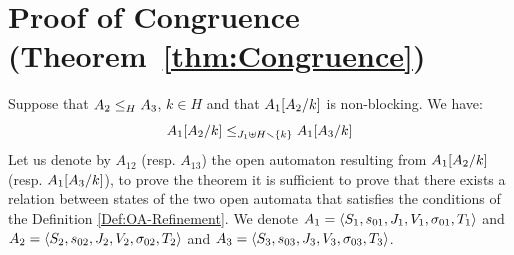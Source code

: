 \documentclass[runningheads]{llncs}
\begin{document}
\begin{enumerate}

\end{enumerate}
\section{Proof of Congruence (Theorem~\ref{thm:Congruence})}

Suppose that $\wrel{A_2}{A_3}{H}$, \(k \in H\) and that \(A_1\subst{A_2}{k}\) is non-blocking.
We have: \[\wrel{A_1\subst{A_2}{k}}{A_1\subst{A_3}{k}}{J_1 \uplus H \setminus \mbrc{k}}\]
\proof
Let us denote by $A_{12}$ (resp. $A_{13}$) the open automaton resulting from $A_1\subst{A_2}{k}$ (resp. $A_1\subst{A_3}{k}$),  to prove the theorem it is sufficient to prove that there exists a relation between states of the two open automata that satisfies the conditions of the Definition \ref{Def:OA-Refinement}. We denote $A_1=  \OA{S_1}{s_{01}}{J_1}{V_1}{\sigma_{01}}{T_1}$ and \(A_2 = \OA{S_2}{s_{02}}{J_2}{V_2}{\sigma_{02}}{T_2}\) and $A_3 = \OA{S_3}{s_{03}}{J_3}{V_3}{\sigma_{03}}{T_3}$.
\end{document}
